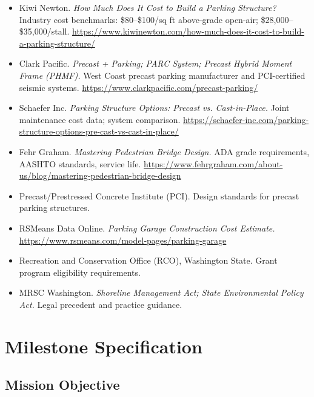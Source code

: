 \documentclass[11pt,letterpaper]{article}
\newcommand{\stageheader}[2]{%
  \noindent\colorbox{#2}{\makebox[\textwidth][l]{%
    \textcolor{white}{\bfseries\sffamily\hspace{6pt}#1\hspace{6pt}}}}%
  \vspace{0.5em}\par%
}
\begin{document}
\begin{itemize}
  \item Kiwi Newton. \textit{How Much Does It Cost to Build a Parking Structure?} Industry cost benchmarks: \$80--\$100/sq ft above-grade open-air; \$28,000--\$35,000/stall. \url{https://www.kiwinewton.com/how-much-does-it-cost-to-build-a-parking-structure/}
  \item Clark Pacific. \textit{Precast + Parking; PARC System; Precast Hybrid Moment Frame (PHMF).} West Coast precast parking manufacturer and PCI-certified seismic systems. \url{https://www.clarkpacific.com/precast-parking/}
  \item Schaefer Inc. \textit{Parking Structure Options: Precast vs. Cast-in-Place.} Joint maintenance cost data; system comparison. \url{https://schaefer-inc.com/parking-structure-options-pre-cast-vs-cast-in-place/}
  \item Fehr Graham. \textit{Mastering Pedestrian Bridge Design.} ADA grade requirements, AASHTO standards, service life. \url{https://www.fehrgraham.com/about-us/blog/mastering-pedestrian-bridge-design}
  \item Precast/Prestressed Concrete Institute (PCI). Design standards for precast parking structures.
  \item RSMeans Data Online. \textit{Parking Garage Construction Cost Estimate.} \url{https://www.rsmeans.com/model-pages/parking-garage}
  \item Recreation and Conservation Office (RCO), Washington State. Grant program eligibility requirements.
  \item MRSC Washington. \textit{Shoreline Management Act; State Environmental Policy Act.} Legal precedent and practice guidance.
\end{itemize}

\newpage
\stageheader{STAGE 3 --- MISSION PACKAGE}{tertiary}

\section{Milestone Specification}

\subsection{Mission Objective}
\end{document}

